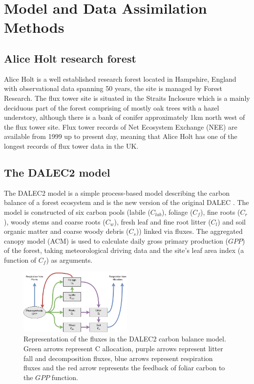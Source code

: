 \documentclass[11pt]{article}
\begin{document}
\section{Model and Data Assimilation Methods}

\subsection{Alice Holt research forest}

Alice Holt is a well established research forest located in Hampshire, England with observational data spanning 50 years, the site is managed by Forest Research. The flux tower site is situated in the Straits Inclosure which is a mainly deciduous part of the forest comprising of mostly oak trees with a hazel understory, although there is a bank of conifer approximately 1km north west of the flux tower site. Flux tower records of Net Ecosystem Exchange (NEE) are available from 1999 up to present day, meaning that Alice Holt has one of the longest records of flux tower data in the UK.  

\subsection{The DALEC2 model}

The DALEC2 model is a simple process-based model describing the carbon balance of a forest ecosystem \citep{Bloom2015} and is the new version of the original DALEC \citep{williams2005improved}. The model is constructed of six carbon pools (labile ($C_{lab}$), foliage ($C_f$), fine roots ($C_r$), woody stems and coarse roots ($C_w$), fresh leaf and fine root litter ($C_l$) and soil organic matter and coarse woody debris ($C_s$)) linked via fluxes. The aggregated canopy model (ACM) \citep{williams1997predicting} is used to calculate daily gross primary production ($GPP$) of the forest, taking meteorological driving data and the site's leaf area index (a function of $C_f$) as arguments.   

\begin{figure}[ht]
    \centering
    \includegraphics[width=0.5\textwidth]{Dalecdiagram.png}
    \caption{Representation of the fluxes in the DALEC2 carbon balance model. Green arrows represent C allocation, purple arrows represent litter fall and decomposition fluxes, blue arrows represent respiration fluxes and the red arrow represents the feedback of foliar carbon to the $GPP$ function.}
    \label{fig:DALEC_mod}
\end{figure}
\end{document}
